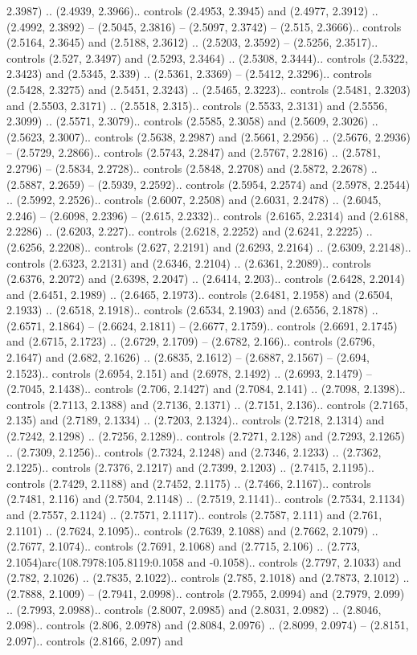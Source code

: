 2.3987) .. (2.4939, 2.3966).. controls (2.4953, 2.3945) and (2.4977, 2.3912) .. (2.4992, 2.3892) -- (2.5045, 2.3816) -- (2.5097, 2.3742) -- (2.515, 2.3666).. controls (2.5164, 2.3645) and (2.5188, 2.3612) .. (2.5203, 2.3592) -- (2.5256, 2.3517).. controls (2.527, 2.3497) and (2.5293, 2.3464) .. (2.5308, 2.3444).. controls (2.5322, 2.3423) and (2.5345, 2.339) .. (2.5361, 2.3369) -- (2.5412, 2.3296).. controls (2.5428, 2.3275) and (2.5451, 2.3243) .. (2.5465, 2.3223).. controls (2.5481, 2.3203) and (2.5503, 2.3171) .. (2.5518, 2.315).. controls (2.5533, 2.3131) and (2.5556, 2.3099) .. (2.5571, 2.3079).. controls (2.5585, 2.3058) and (2.5609, 2.3026) .. (2.5623, 2.3007).. controls (2.5638, 2.2987) and (2.5661, 2.2956) .. (2.5676, 2.2936) -- (2.5729, 2.2866).. controls (2.5743, 2.2847) and (2.5767, 2.2816) .. (2.5781, 2.2796) -- (2.5834, 2.2728).. controls (2.5848, 2.2708) and (2.5872, 2.2678) .. (2.5887, 2.2659) -- (2.5939, 2.2592).. controls (2.5954, 2.2574) and (2.5978, 2.2544) .. (2.5992, 2.2526).. controls (2.6007, 2.2508) and (2.6031, 2.2478) .. (2.6045, 2.246) -- (2.6098, 2.2396) -- (2.615, 2.2332).. controls (2.6165, 2.2314) and (2.6188, 2.2286) .. (2.6203, 2.227).. controls (2.6218, 2.2252) and (2.6241, 2.2225) .. (2.6256, 2.2208).. controls (2.627, 2.2191) and (2.6293, 2.2164) .. (2.6309, 2.2148).. controls (2.6323, 2.2131) and (2.6346, 2.2104) .. (2.6361, 2.2089).. controls (2.6376, 2.2072) and (2.6398, 2.2047) .. (2.6414, 2.203).. controls (2.6428, 2.2014) and (2.6451, 2.1989) .. (2.6465, 2.1973).. controls (2.6481, 2.1958) and (2.6504, 2.1933) .. (2.6518, 2.1918).. controls (2.6534, 2.1903) and (2.6556, 2.1878) .. (2.6571, 2.1864) -- (2.6624, 2.1811) -- (2.6677, 2.1759).. controls (2.6691, 2.1745) and (2.6715, 2.1723) .. (2.6729, 2.1709) -- (2.6782, 2.166).. controls (2.6796, 2.1647) and (2.682, 2.1626) .. (2.6835, 2.1612) -- (2.6887, 2.1567) -- (2.694, 2.1523).. controls (2.6954, 2.151) and (2.6978, 2.1492) .. (2.6993, 2.1479) -- (2.7045, 2.1438).. controls (2.706, 2.1427) and (2.7084, 2.141) .. (2.7098, 2.1398).. controls (2.7113, 2.1388) and (2.7136, 2.1371) .. (2.7151, 2.136).. controls (2.7165, 2.135) and (2.7189, 2.1334) .. (2.7203, 2.1324).. controls (2.7218, 2.1314) and (2.7242, 2.1298) .. (2.7256, 2.1289).. controls (2.7271, 2.128) and (2.7293, 2.1265) .. (2.7309, 2.1256).. controls (2.7324, 2.1248) and (2.7346, 2.1233) .. (2.7362, 2.1225).. controls (2.7376, 2.1217) and (2.7399, 2.1203) .. (2.7415, 2.1195).. controls (2.7429, 2.1188) and (2.7452, 2.1175) .. (2.7466, 2.1167).. controls (2.7481, 2.116) and (2.7504, 2.1148) .. (2.7519, 2.1141).. controls (2.7534, 2.1134) and (2.7557, 2.1124) .. (2.7571, 2.1117).. controls (2.7587, 2.111) and (2.761, 2.1101) .. (2.7624, 2.1095).. controls (2.7639, 2.1088) and (2.7662, 2.1079) .. (2.7677, 2.1074).. controls (2.7691, 2.1068) and (2.7715, 2.106) .. (2.773, 2.1054)arc(108.7978:105.8119:0.1058 and -0.1058).. controls (2.7797, 2.1033) and (2.782, 2.1026) .. (2.7835, 2.1022).. controls (2.785, 2.1018) and (2.7873, 2.1012) .. (2.7888, 2.1009) -- (2.7941, 2.0998).. controls (2.7955, 2.0994) and (2.7979, 2.099) .. (2.7993, 2.0988).. controls (2.8007, 2.0985) and (2.8031, 2.0982) .. (2.8046, 2.098).. controls (2.806, 2.0978) and (2.8084, 2.0976) .. (2.8099, 2.0974) -- (2.8151, 2.097).. controls (2.8166, 2.097) and 